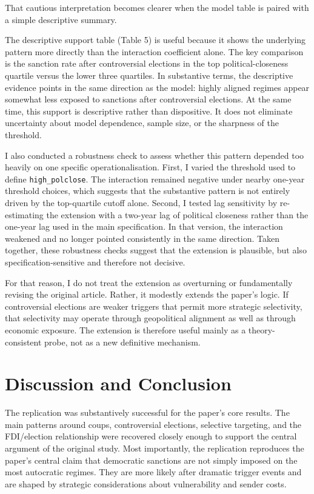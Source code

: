 \documentclass[12pt,letterpaper]{article}
\begin{document}
	That cautious interpretation becomes clearer when the model table is paired with a simple descriptive summary.
	
	
	
	The descriptive support table (Table 5) is useful because it shows the underlying pattern more directly than the interaction coefficient alone. The key comparison is the sanction rate after controversial elections in the top political-closeness quartile versus the lower three quartiles. In substantive terms, the descriptive evidence points in the same direction as the model: highly aligned regimes appear somewhat less exposed to sanctions after controversial elections. At the same time, this support is descriptive rather than dispositive. It does not eliminate uncertainty about model dependence, sample size, or the sharpness of the threshold.
	
	I also conducted a robustness check to assess whether this pattern depended too heavily on one specific operationalisation. First, I varied the threshold used to define \texttt{high\_polclose}. The interaction remained negative under nearby one-year threshold choices, which suggests that the substantive pattern is not entirely driven by the top-quartile cutoff alone. Second, I tested lag sensitivity by re-estimating the extension with a two-year lag of political closeness rather than the one-year lag used in the main specification. In that version, the interaction weakened and no longer pointed consistently in the same direction. Taken together, these robustness checks suggest that the extension is plausible, but also specification-sensitive and therefore not decisive.
	
	For that reason, I do not treat the extension as overturning or fundamentally revising the original article. Rather, it modestly extends the paper's logic. If controversial elections are weaker triggers that permit more strategic selectivity, that selectivity may operate through geopolitical alignment as well as through economic exposure. The extension is therefore useful mainly as a theory-consistent probe, not as a new definitive mechanism.
	\FloatBarrier
	
	\section{Discussion and Conclusion}
	
	The replication was substantively successful for the paper's core results. The main patterns around coups, controversial elections, selective targeting, and the FDI/election relationship were recovered closely enough to support the central argument of the original study. Most importantly, the replication reproduces the paper's central claim that democratic sanctions are not simply imposed on the most autocratic regimes. They are more likely after dramatic trigger events and are shaped by strategic considerations about vulnerability and sender costs.
	
\end{document}
